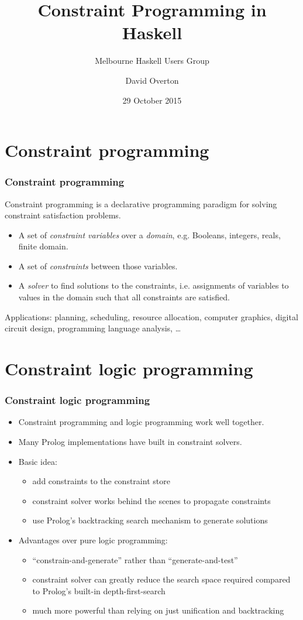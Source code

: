 \documentclass[aspectratio=169,hyphens]{beamer} %
\title{Constraint Programming in Haskell}
\subtitle{Melbourne Haskell Users Group}
\author{David Overton}
\date{29 October 2015}
\begin{document}
\frame{\titlepage}

\section{Constraint programming}

\begin{frame}
    \frametitle{Constraint programming}
    Constraint programming is a declarative programming paradigm for solving constraint satisfaction problems.
    \pause
    \begin{itemize}
        \item A set of \emph{constraint variables} over a \emph{domain}, e.g. Booleans, integers, reals, finite domain.
        \item A set of \emph{constraints} between those variables.
        \item A \emph{solver} to find solutions to the constraints, i.e. assignments of variables to values in the domain such that all constraints are satisfied.
    \end{itemize}
    \pause
    Applications: planning, scheduling, resource allocation, computer graphics, digital circuit design, programming language analysis, \ldots
\end{frame}

\section{Constraint logic programming}

\begin{frame}
    \frametitle{Constraint logic programming}
    \begin{itemize}
        \item Constraint programming and logic programming work well together.
        \item Many Prolog implementations have built in constraint solvers.
        \item Basic idea:
            \begin{itemize}
                \item add constraints to the constraint store
                \item constraint solver works behind the scenes to propagate constraints
                \item use Prolog's backtracking search mechanism to generate solutions
            \end{itemize}
        \item Advantages over pure logic programming:
            \begin{itemize}
                \item ``constrain-and-generate'' rather than ``generate-and-test''
                \item constraint solver can greatly reduce the search space required compared to Prolog's built-in depth-first-search
                \item much more powerful than relying on just unification and backtracking
            \end{itemize}
    \end{itemize}
\end{frame}
\end{document}
